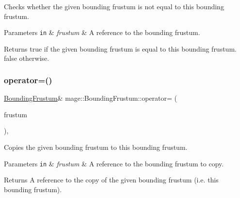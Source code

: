 Checks whether the given bounding frustum is not equal to this bounding frustum.


\begin{DoxyParams}[1]{Parameters}
\mbox{\tt in}  & {\em frustum} & A reference to the bounding frustum. \\
\hline
\end{DoxyParams}
\begin{DoxyReturn}{Returns}
{\ttfamily true} if the given bounding frustum is equal to this bounding frustum. {\ttfamily false} otherwise. 
\end{DoxyReturn}
\hypertarget{classmage_1_1_bounding_frustum_a713509c0c2e9e947bc448e2743903c12}{}\label{classmage_1_1_bounding_frustum_a713509c0c2e9e947bc448e2743903c12} 
\subsubsection{\texorpdfstring{operator=()}{operator=()}\hspace{0.1cm}{\footnotesize\ttfamily [1/2]}}
{\footnotesize\ttfamily \hyperlink{classmage_1_1_bounding_frustum}{Bounding\+Frustum}\& mage\+::\+Bounding\+Frustum\+::operator= (\begin{DoxyParamCaption}\item[{const \hyperlink{classmage_1_1_bounding_frustum}{Bounding\+Frustum} \&}]{frustum }\end{DoxyParamCaption})\hspace{0.3cm}{\ttfamily [default]}, {\ttfamily [noexcept]}}

Copies the given bounding frustum to this bounding frustum.


\begin{DoxyParams}[1]{Parameters}
\mbox{\tt in}  & {\em frustum} & A reference to the bounding frustum to copy. \\
\hline
\end{DoxyParams}
\begin{DoxyReturn}{Returns}
A reference to the copy of the given bounding frustum (i.\+e. this bounding frustum). 
\end{DoxyReturn}
\hypertarget{classmage_1_1_bounding_frustum_ae6a344dc47b0a8dffd49fc4a95c364a5}{}\label{classmage_1_1_bounding_frustum_ae6a344dc47b0a8dffd49fc4a95c364a5} 
